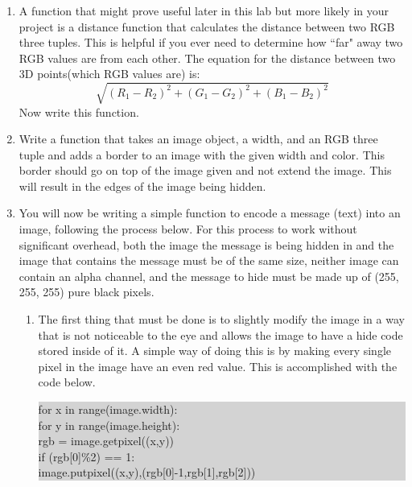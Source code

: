 \documentclass[11pt, letterpaper, onecolumn, oneside, final]{article}
\begin{document}
\begin{enumerate}
    \item A function that might prove useful later in this lab but more likely in your project is a distance function that calculates the distance between two RGB three tuples. This is helpful if you ever need to determine how \textquotedblleft far" away two RGB values are from each other. The equation for the distance between two 3D points(which RGB values are) is:
    $$
        \sqrt{(R_1 - R_2)^2+(G_1 - G_2)^2+(B_1 - B_2)^2}
    $$
    Now write this function.
    
    
    
    \item Write a function that takes an image object, a width, and an RGB three tuple and adds a border to an image with the given width and color. This border should go on top of the image given and not extend the image. This will result in the edges of the image being hidden.
    
    \item You will now be writing a simple function to encode a message (text) into an image, following the process below. For this process to work without significant overhead, both the image the message is being hidden in and the image that contains the message must be of the same size, neither image can contain an alpha channel, and the message to hide must be made up of (255, 255, 255) pure black pixels.%
    \begin{enumerate}
        \item The first thing that must be done is to slightly modify the image in a way that is not noticeable to the eye and allows the image to have a hide code stored inside of it. A simple way of doing this is by making every single pixel in the image have an even red value. This is accomplished with the code below.
        
        \begin{center}
        \colorbox{lightgray}{\parbox{.75\textwidth}{\consolas 
        for x in range(image.width):\\
        \hspace*{8mm}for y in range(image.height):\\
        \hspace*{16mm}rgb = image.getpixel((x,y))\\
        \hspace*{16mm}if (rgb[0]\%2) == 1:\\
        \hspace*{24mm}image.putpixel((x,y),(rgb[0]-1,rgb[1],rgb[2]))  }} 
        \end{center}
         

\end{enumerate}
\end{enumerate}
\end{document}
